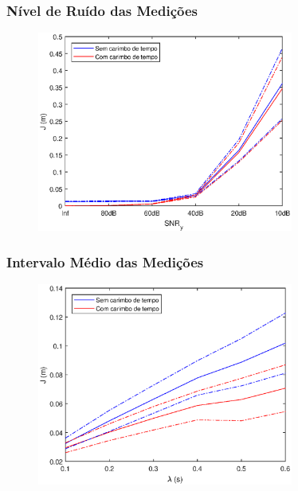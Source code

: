 \documentclass{beamer}
\begin{document}

\begin{frame}
	\frametitle{Nível de Ruído das Medições}
	
	\begin{figure}
		\centering
		\includegraphics[width=0.75\textwidth]{images/noise.eps}
	\end{figure}


\end{frame}

\begin{frame}
	\frametitle{Intervalo Médio das Medições}
	
	\begin{figure}
		\centering
		\includegraphics[width=0.75\textwidth]{images/samp.eps}
	\end{figure}

\end{frame}

\end{document}
